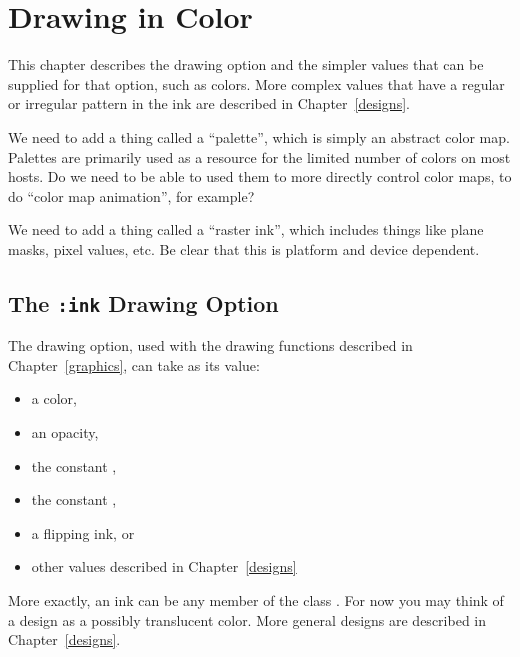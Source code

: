 
\chapter {Drawing in Color}
\label {color}

This chapter describes the  drawing option and the simpler values that
can be supplied for that option, such as colors.  More complex values that have
a regular or irregular pattern in the ink are described in Chapter~\ref{designs}.

 {We need to add a thing called a ``palette'', which is simply an
abstract color map.  Palettes are primarily used as a resource for the limited
number of colors on most hosts.  Do we need to be able to used them to more
directly control color maps, to do ``color map animation'', for example?}

 {We need to add a thing called a ``raster ink'', which includes
things like plane masks, pixel values, etc.  Be clear that this is platform and
device dependent.}


\section {The {\tt :ink} Drawing Option}

The  drawing option, used with the drawing functions described in
Chapter~\ref{graphics}, can take as its value:
\begin{itemize}
\item a color,

\item an opacity,

\item the constant ,

\item the constant ,

\item a flipping ink, or

\item other values described in Chapter~\ref{designs}
\end{itemize}

More exactly, an ink can be any member of the class .  For now you
may think of a design as a possibly translucent color.  More general designs are
described in Chapter~\ref{designs}.

